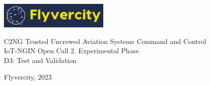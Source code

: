 \documentclass[a4paper]{article}
\begin{document}
 
\thispagestyle{empty}
\begin{flushright}
    \includegraphics[width=0.4\textwidth]{docs/images/Logo.png}
\end{flushright}
\vfill
\begin{center}
    {\LARGE C2NG Trusted Uncrewed Aviation Systems Command and Control} \\
    \vspace{1cm}
    {\Large IoT-NGIN Open Call 2. Experimental Phase} \\
    \vspace{1cm}
    {\Large D3: Test and Validation}
\end{center}
\vfill
\begin{center}
    Flyvercity, 2023
\end{center}
\end{document}
